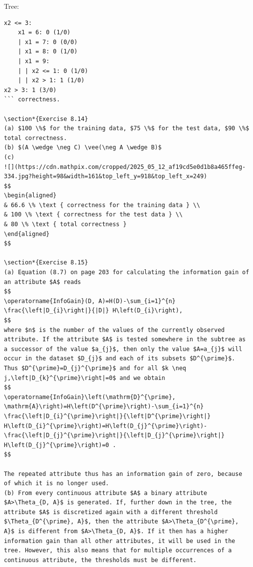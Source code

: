 \documentclass[10pt]{book}
\begin{document}
\begin{center}
\begin{enumerate}
\begin{center}
\begin{center}
\begin{center}
\begin{center}
\begin{center}
Tree:

\begin{verbatim}
x2 <= 3:
    x1 = 6: 0 (1/0)
    | x1 = 7: 0 (0/0)
    | x1 = 8: 0 (1/0)
    | x1 = 9:
    | | x2 <= 1: 0 (1/0)
    | | x2 > 1: 1 (1/0)
x2 > 3: 1 (3/0)
``` correctness.

\section*{Exercise 8.14}
(a) $100 \%$ for the training data, $75 \%$ for the test data, $90 \%$ total correctness.
(b) $(A \wedge \neg C) \vee(\neg A \wedge B)$
(c)
![](https://cdn.mathpix.com/cropped/2025_05_12_af19cd5e0d1b8a465ffeg-334.jpg?height=98&width=161&top_left_y=918&top_left_x=249)
$$
\begin{aligned}
& 66.6 \% \text { correctness for the training data } \\
& 100 \% \text { correctness for the test data } \\
& 80 \% \text { total correctness }
\end{aligned}
$$

\section*{Exercise 8.15}
(a) Equation (8.7) on page 203 for calculating the information gain of an attribute $A$ reads
$$
\operatorname{InfoGain}(D, A)=H(D)-\sum_{i=1}^{n} \frac{\left|D_{i}\right|}{|D|} H\left(D_{i}\right),
$$
where $n$ is the number of the values of the currently observed attribute. If the attribute $A$ is tested somewhere in the subtree as a successor of the value $a_{j}$, then only the value $A=a_{j}$ will occur in the dataset $D_{j}$ and each of its subsets $D^{\prime}$. Thus $D^{\prime}=D_{j}^{\prime}$ and for all $k \neq j,\left|D_{k}^{\prime}\right|=0$ and we obtain
$$
\operatorname{InfoGain}\left(\mathrm{D}^{\prime}, \mathrm{A}\right)=H\left(D^{\prime}\right)-\sum_{i=1}^{n} \frac{\left|D_{i}^{\prime}\right|}{\left|D^{\prime}\right|} H\left(D_{i}^{\prime}\right)=H\left(D_{j}^{\prime}\right)-\frac{\left|D_{j}^{\prime}\right|}{\left|D_{j}^{\prime}\right|} H\left(D_{j}^{\prime}\right)=0 .
$$

The repeated attribute thus has an information gain of zero, because of which it is no longer used.
(b) From every continuous attribute $A$ a binary attribute $A>\Theta_{D, A}$ is generated. If, further down in the tree, the attribute $A$ is discretized again with a different threshold $\Theta_{D^{\prime}, A}$, then the attribute $A>\Theta_{D^{\prime}, A}$ is different from $A>\Theta_{D, A}$. If it then has a higher information gain than all other attributes, it will be used in the tree. However, this also means that for multiple occurrences of a continuous attribute, the thresholds must be different.


\end{verbatim}
\end{center}
\end{center}
\end{center}
\end{center}
\end{center}
\end{enumerate}
\end{center}
\end{document}
